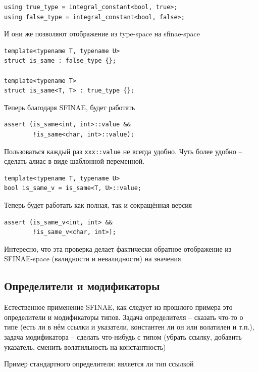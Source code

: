 \documentclass[a4paper,12pt,oneside]{book}
\begin{document}
\begin{lstlisting}
using true_type = integral_constant<bool, true>;
using false_type = integral_constant<bool, false>;
\end{lstlisting}

И они же позволяют отображение из type-space на sfinae-space

\begin{lstlisting}
template<typename T, typename U> 
struct is_same : false_type {};

template<typename T> 
struct is_same<T, T> : true_type {};
\end{lstlisting}

Теперь благодаря SFINAE, будет работать

\begin{lstlisting}
assert (is_same<int, int>::value && 
        !is_same<char, int>::value);
\end{lstlisting}
 
Пользоваться каждый раз \lstinline!xxx::value! не всегда удобно. Чуть более удобно -- сделать алиас в виде шаблонной переменной.

\begin{lstlisting}
template<typename T, typename U> 
bool is_same_v = is_same<T, U>::value;
\end{lstlisting}

Теперь будет работать как полная, так и сокращённая версия

\begin{lstlisting}
assert (is_same_v<int, int> && 
        !is_same_v<char, int>);
\end{lstlisting}

Интересно, что эта проверка делает фактически обратное отображение из SFINAE-space (валидности и невалидности) на значения.

\subsection{Определители и модификаторы}\label{TypeTraits}

Естественное применение SFINAE, как следует из прошлого примера это определители и модификаторы типов. Задача определителя -- сказать что-то о типе (есть ли в нём ссылки и указатели, константен ли он или волатилен и т.п.), задача модификатора -- сделать что-нибудь с типом (убрать ссылку, добавить указатель, сменить волатильность на константность)

Пример стандартного определителя: является ли тип ссылкой
\end{document}
